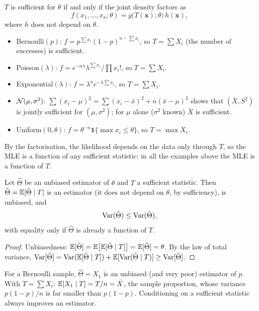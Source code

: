 \begin{theorem}\label{thm:factor}
$T$ is sufficient for $\theta$ if and only if the joint density factors as
\[ f(x_1,\dots,x_n;\theta)=g\big(T(\mathbf{x});\theta\big)\,h(\mathbf{x}), \]
where $h$ does not depend on $\theta$.
\end{theorem}

\begin{example}
\begin{itemize}
  \item Bernoulli$(p)$: $f=p^{\sum x_i}(1-p)^{n-\sum x_i}$, so $T=\sum X_i$ (the number of successes) is sufficient.
  \item Poisson$(\lambda)$: $f=e^{-n\lambda}\lambda^{\sum x_i}/\prod x_i!$, so $T=\sum X_i$.
  \item Exponential$(\lambda)$: $f=\lambda^ne^{-\lambda\sum x_i}$, so $T=\sum X_i$.
  \item $\mathcal{N}(\mu,\sigma^2)$: $\sum(x_i-\mu)^2=\sum(x_i-\bar{x})^2+n(\bar{x}-\mu)^2$ shows that $(\bar{X},S^2)$ is jointly sufficient for $(\mu,\sigma^2)$; for $\mu$ alone ($\sigma^2$ known) $\bar{X}$ is sufficient.
  \item Uniform$(0,\theta)$: $f=\theta^{-n}\mathbf{1}\{\max x_i\le\theta\}$, so $T=\max X_i$.
\end{itemize}
\end{example}

By the factorisation, the likelihood depends on the data only through $T$, so the MLE is a function of any sufficient statistic: in all the examples above the MLE is a function of $T$.

\begin{theorem}\label{thm:rb}
Let $\hat\Theta$ be an unbiased estimator of $\theta$ and $T$ a sufficient statistic. Then $\tilde\Theta=\mathbb{E}[\hat\Theta\mid T]$ is an estimator (it does not depend on $\theta$, by sufficiency), is unbiased, and
\[ \operatorname{Var}(\tilde\Theta)\le\operatorname{Var}(\hat\Theta), \]
with equality only if $\hat\Theta$ is already a function of $T$.
\end{theorem}

\begin{proof}
Unbiasedness: $\mathbb{E}[\tilde\Theta]=\mathbb{E}\big[\mathbb{E}[\hat\Theta\mid T]\big]=\mathbb{E}[\hat\Theta]=\theta$. By the law of total variance, $\operatorname{Var}[\hat\Theta]=\operatorname{Var}(\mathbb{E}[\hat\Theta\mid T])+\mathbb{E}[\operatorname{Var}(\hat\Theta\mid T)]\ge\operatorname{Var}[\tilde\Theta]$.
\end{proof}

\begin{example}
For a Bernoulli sample, $\hat\Theta=X_1$ is an unbiased (and very poor) estimator of $p$. With $T=\sum X_i$: $\mathbb{E}[X_1\mid T]=T/n=\bar{X}$, the sample proportion, whose variance $p(1-p)/n$ is far smaller than $p(1-p)$. Conditioning on a sufficient statistic always improves an estimator.
\end{example}

